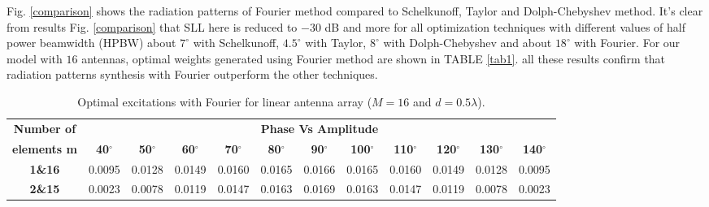 \documentclass[conference]{IEEEtran}
\begin{document}
Fig. \ref{comparison} shows the radiation patterns of Fourier method compared to Schelkunoff, Taylor and Dolph-Chebyshev method. It's clear from results Fig. \ref{comparison} that SLL here is reduced to $-30$ dB and more for all optimization techniques with different values of half power beamwidth (HPBW) about $7^\circ$ with Schelkunoff, $4.5^\circ$ with Taylor, $8^\circ$ with Dolph-Chebyshev and about $18^\circ$ with Fourier. For our model with $16$ antennas, optimal weights generated using Fourier method are shown in TABLE \ref{tab1}. all these results confirm that radiation patterns synthesis with Fourier outperform the other techniques. 





\begin{table*}[ht]
\caption{Optimal excitations with Fourier for linear antenna array ($M=16$ and  $d = 0.5\lambda$).}
\begin{center}
\renewcommand{\arraystretch}{1.05}
\small{
\begin{tabular}{|l|l|l|l|l|l|l|l|l|l|l|l|}
\cline{2-12}
\hline
\multicolumn{1}{|c|}{\textbf{Number of}} & \multicolumn{11}{c|}{\textbf{Phase Vs Amplitude}} \\ 
\cline{2-12}
\multicolumn{1}{|c|}{\textbf{elements m}} & \multicolumn{1}{c|}{\textbf{40$^\circ$}} & \multicolumn{1}{c|}{\textbf{50$^\circ$}} & \multicolumn{1}{c|}{\textbf{60$^\circ$}} & \multicolumn{1}{c|}{\textbf{70$^\circ$}} & \multicolumn{1}{c|}{\textbf{80$^\circ$}} & \multicolumn{1}{c|}{\textbf{90$^\circ$}} & \multicolumn{1}{c|}{\textbf{100$^\circ$}} & \multicolumn{1}{c|}{\textbf{110$^\circ$}} & \multicolumn{1}{c|}{\textbf{120$^\circ$}} & \multicolumn{1}{c|}{\textbf{130$^\circ$}} & \multicolumn{1}{c|}{\textbf{140$^\circ$}} \\ 
\hline
\multicolumn{1}{|c|}{\textbf{1\&16}} & \multicolumn{1}{c|}{0.0095} & \multicolumn{1}{c|}{0.0128} & \multicolumn{1}{c|}{0.0149} & \multicolumn{1}{c|}{0.0160} & \multicolumn{1}{c|}{0.0165} & \multicolumn{1}{c|}{0.0166} & \multicolumn{1}{c|}{0.0165} & \multicolumn{1}{c|}{0.0160} & \multicolumn{1}{c|}{0.0149} & \multicolumn{1}{c|}{0.0128} & \multicolumn{1}{c|}{0.0095} \\ 
\hline
\multicolumn{1}{|c|}{\textbf{2\&15}} & \multicolumn{1}{c|}{0.0023} & \multicolumn{1}{c|}{0.0078} & \multicolumn{1}{c|}{0.0119} & \multicolumn{1}{c|}{0.0147} & \multicolumn{1}{c|}{0.0163} & \multicolumn{1}{c|}{0.0169} & \multicolumn{1}{c|}{0.0163} & \multicolumn{1}{c|}{0.0147} & \multicolumn{1}{c|}{0.0119} & \multicolumn{1}{c|}{0.0078} & \multicolumn{1}{c|}{0.0023} \\ 

\end{tabular}}
\end{center}
\end{table*}
\end{document}
